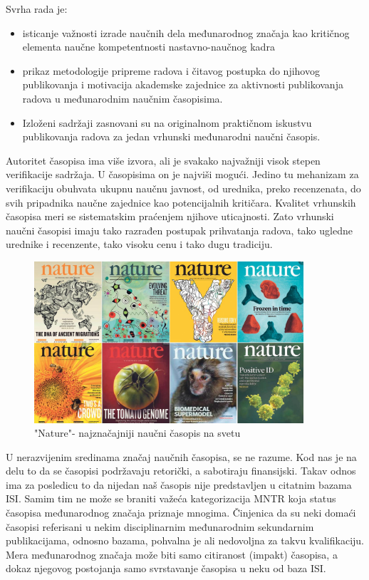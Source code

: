 \documentclass[12pt,a4paper]{article}
\begin{document}
     Svrha rada je: 
    \begin{itemize}
        \item isticanje važnosti izrade naučnih dela međunarodnog značaja kao kritičnog elementa naučne kompetentnosti nastavno-naučnog kadra
        \item prikaz metodologije pripreme radova i čitavog postupka do njihovog publikovanja i motivacija akademske zajednice za aktivnosti publikovanja radova u međunarodnim naučnim časopisima.
        \item Izloženi sadržaji zasnovani su na originalnom praktičnom iskustvu publikovanja radova za jedan vrhunski međunarodni naučni časopis.
    \end{itemize}    
    \qquad 

    Autoritet časopisa ima više izvora, ali je svakako najvažniji visok stepen verifikacije sadržaja. U časopisima on je najviši mogući. Jedino tu mehanizam za verifikaciju obuhvata ukupnu naučnu javnost, od urednika, preko recenzenata, do svih pripadnika naučne zajednice kao potencijalnih kritičara. Kvalitet vrhunskih časopisa meri se sistematskim praćenjem njihove uticajnosti. Zato vrhunski naučni časopisi imaju tako razrađen postupak prihvatanja radova, tako ugledne urednike i recenzente, tako visoku cenu i tako dugu tradiciju. 

        
            
        \begin{figure} [h]
        \centering  
        \includegraphics [width=10cm] {nature.png} 
        \caption{"Nature"- najznačajniji naučni časopis na svetu}\label{slika2}
        \end{figure}  


     U nerazvijenim sredinama značaj naučnih časopisa, se ne razume. Kod nas je na delu to da se časopisi podržavaju retorički, a sabotiraju finansijski. Takav odnos ima za posledicu to da nijedan naš časopis nije predstavljen u citatnim bazama ISI. Samim tim ne može se braniti važeća kategorizacija MNTR koja status časopisa međunarodnog značaja priznaje mnogima. Činjenica da su neki domaći časopisi referisani u nekim disciplinarnim međunarodnim sekundarnim publikacijama, odnosno bazama, pohvalna je ali nedovoljna za takvu kvalifikaciju. Mera međunarodnog značaja može biti samo citiranost (impakt) časopisa, a dokaz njegovog postojanja samo svrstavanje časopisa u neku od baza ISI. 
     
\end{document}
